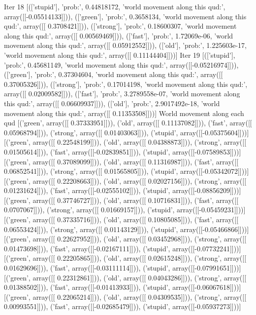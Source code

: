 Iter 18 [(['stupid'], 'prob:', 0.44818172, 'world movement along this qud:', array([[-0.05514133]])), (['green'], 'prob:', 0.3658134, 'world movement along this qud:', array([[ 0.3708421]])), (['strong'], 'prob:', 0.18600307, 'world movement along this qud:', array([[ 0.00569469]])), (['fast'], 'prob:', 1.72069e-06, 'world movement along this qud:', array([[ 0.05912552]])), (['old'], 'prob:', 1.225603e-17, 'world movement along this qud:', array([[ 0.11144404]]))]
Iter 19 [(['stupid'], 'prob:', 0.45681149, 'world movement along this qud:', array([[-0.05216974]])), (['green'], 'prob:', 0.37304604, 'world movement along this qud:', array([[ 0.37005326]])), (['strong'], 'prob:', 0.17014198, 'world movement along this qud:', array([[ 0.02009582]])), (['fast'], 'prob:', 3.2789558e-07, 'world movement along this qud:', array([[ 0.06609937]])), (['old'], 'prob:', 2.9017492e-18, 'world movement along this qud:', array([[ 0.11353508]]))]
World movement along each qud
[('green', array([[ 0.37333951]])), ('old', array([[ 0.11137082]])), ('fast', array([[ 0.05968794]])), ('strong', array([[ 0.01403063]])), ('stupid', array([[-0.05375604]]))]
[('green', array([[ 0.22548199]])), ('old', array([[ 0.04388873]])), ('strong', array([[ 0.01505614]])), ('fast', array([[-0.02839851]])), ('stupid', array([[-0.07589853]]))]
[('green', array([[ 0.37089099]])), ('old', array([[ 0.11316987]])), ('fast', array([[ 0.06852541]])), ('strong', array([[ 0.01565805]])), ('stupid', array([[-0.05342072]]))]
[('green', array([[ 0.22208663]])), ('old', array([[ 0.02027156]])), ('strong', array([[ 0.01231624]])), ('fast', array([[-0.02555102]])), ('stupid', array([[-0.08856209]]))]
[('green', array([[ 0.37746727]])), ('old', array([[ 0.10716831]])), ('fast', array([[ 0.0707067]])), ('strong', array([[ 0.01669157]])), ('stupid', array([[-0.05459231]]))]
[('green', array([[ 0.37335716]])), ('old', array([[ 0.10805085]])), ('fast', array([[ 0.06553424]])), ('strong', array([[ 0.01143129]])), ('stupid', array([[-0.05466866]]))]
[('green', array([[ 0.22627952]])), ('old', array([[ 0.03452968]])), ('strong', array([[ 0.01473698]])), ('fast', array([[-0.02167111]])), ('stupid', array([[-0.07732241]]))]
[('green', array([[ 0.22205865]])), ('old', array([[ 0.02615248]])), ('strong', array([[ 0.01629696]])), ('fast', array([[-0.03111114]])), ('stupid', array([[-0.07991651]]))]
[('green', array([[ 0.22312861]])), ('old', array([[ 0.04043286]])), ('strong', array([[ 0.01388502]])), ('fast', array([[-0.01413933]])), ('stupid', array([[-0.06067618]]))]
[('green', array([[ 0.22065214]])), ('old', array([[ 0.04309535]])), ('strong', array([[ 0.00993551]])), ('fast', array([[-0.02685479]])), ('stupid', array([[-0.05937273]]))]
